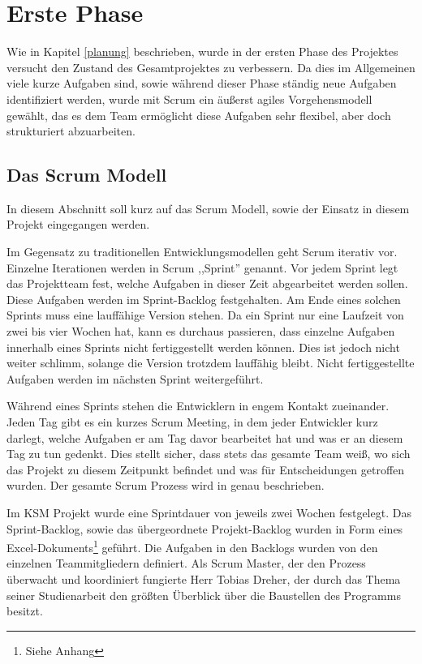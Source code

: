 \section{Erste Phase}

Wie in Kapitel \ref{planung} beschrieben, wurde in der ersten Phase des Projektes versucht den Zustand des Gesamtprojektes zu verbessern. Da dies im Allgemeinen viele kurze Aufgaben sind, sowie während dieser Phase ständig neue Aufgaben identifiziert werden, wurde mit Scrum ein äußerst agiles Vorgehensmodell gewählt, das es dem Team ermöglicht diese Aufgaben sehr flexibel, aber doch strukturiert abzuarbeiten.

\subsection{Das Scrum Modell}

In diesem Abschnitt soll kurz auf das Scrum Modell, sowie der Einsatz in diesem Projekt eingegangen werden.

Im Gegensatz zu traditionellen Entwicklungsmodellen geht Scrum iterativ vor. Einzelne Iterationen werden in Scrum ,,Sprint'' genannt. Vor jedem Sprint legt das Projektteam fest, welche Aufgaben in dieser Zeit abgearbeitet werden sollen. Diese Aufgaben werden im Sprint-Backlog festgehalten. Am Ende eines solchen Sprints muss eine lauffähige Version stehen. Da ein Sprint nur eine Laufzeit von zwei bis vier Wochen hat, kann es durchaus passieren, dass einzelne Aufgaben innerhalb eines Sprints nicht fertiggestellt werden können. Dies ist jedoch nicht weiter schlimm, solange die Version trotzdem lauffähig bleibt. Nicht fertiggestellte Aufgaben werden im nächsten Sprint  weitergeführt. 

Während eines Sprints stehen die Entwicklern in engem Kontakt zueinander. Jeden Tag gibt es ein kurzes Scrum Meeting, in dem jeder Entwickler kurz darlegt, welche Aufgaben er am Tag davor bearbeitet hat und was er an diesem Tag zu tun gedenkt. Dies stellt sicher, dass stets das gesamte Team weiß, wo sich das Projekt zu diesem Zeitpunkt befindet und was für Entscheidungen getroffen wurden. Der gesamte Scrum Prozess wird in \cite{bib:agil} genau beschrieben.

Im KSM Projekt wurde eine Sprintdauer von jeweils zwei Wochen festgelegt. Das Sprint-Backlog, sowie das übergeordnete Projekt-Backlog wurden in Form eines Excel-Do\-ku\-ments\footnote{Siehe Anhang} geführt. Die Aufgaben in den Backlogs wurden von den einzelnen Teammitgliedern definiert. Als Scrum Master, der den Prozess überwacht und koordiniert fungierte Herr Tobias Dreher, der durch das Thema seiner Studienarbeit den größten Überblick über die Baustellen des Programms besitzt.

